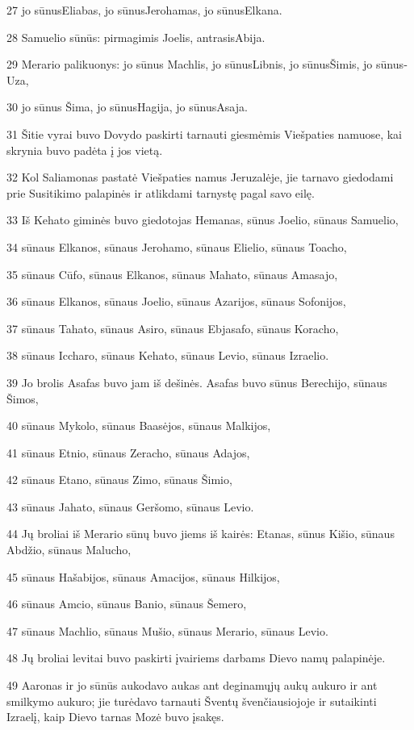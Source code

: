 \par 27 jo sūnus­Eliabas, jo sūnus­Jerohamas, jo sūnus­Elkana. 
\par 28 Samuelio sūnūs: pirmagimis­ Joelis, antrasis­Abija. 
\par 29 Merario palikuonys: jo sūnus­ Machlis, jo sūnus­Libnis, jo sūnus­Šimis, jo sūnus­Uza, 
\par 30 jo sūnus Šima, jo sūnus­Hagija, jo sūnus­Asaja. 
\par 31 Šitie vyrai buvo Dovydo paskirti tarnauti giesmėmis Viešpaties namuose, kai skrynia buvo padėta į jos vietą. 
\par 32 Kol Saliamonas pastatė Viešpaties namus Jeruzalėje, jie tarnavo giedodami prie Susitikimo palapinės ir atlikdami tarnystę pagal savo eilę. 
\par 33 Iš Kehato giminės buvo giedotojas Hemanas, sūnus Joelio, sūnaus Samuelio, 
\par 34 sūnaus Elkanos, sūnaus Jerohamo, sūnaus Elielio, sūnaus Toacho, 
\par 35 sūnaus Cūfo, sūnaus Elkanos, sūnaus Mahato, sūnaus Amasajo, 
\par 36 sūnaus Elkanos, sūnaus Joelio, sūnaus Azarijos, sūnaus Sofonijos, 
\par 37 sūnaus Tahato, sūnaus Asiro, sūnaus Ebjasafo, sūnaus Koracho, 
\par 38 sūnaus Iccharo, sūnaus Kehato, sūnaus Levio, sūnaus Izraelio. 
\par 39 Jo brolis Asafas buvo jam iš dešinės. Asafas buvo sūnus Berechijo, sūnaus Šimos, 
\par 40 sūnaus Mykolo, sūnaus Baasėjos, sūnaus Malkijos, 
\par 41 sūnaus Etnio, sūnaus Zeracho, sūnaus Adajos, 
\par 42 sūnaus Etano, sūnaus Zimo, sūnaus Šimio, 
\par 43 sūnaus Jahato, sūnaus Geršomo, sūnaus Levio. 
\par 44 Jų broliai iš Merario sūnų buvo jiems iš kairės: Etanas, sūnus Kišio, sūnaus Abdžio, sūnaus Malucho, 
\par 45 sūnaus Hašabijos, sūnaus Amacijos, sūnaus Hilkijos, 
\par 46 sūnaus Amcio, sūnaus Banio, sūnaus Šemero, 
\par 47 sūnaus Machlio, sūnaus Mušio, sūnaus Merario, sūnaus Levio. 
\par 48 Jų broliai levitai buvo paskirti įvairiems darbams Dievo namų palapinėje. 
\par 49 Aaronas ir jo sūnūs aukodavo aukas ant deginamųjų aukų aukuro ir ant smilkymo aukuro; jie turėdavo tarnauti Šventų švenčiausiojoje ir sutaikinti Izraelį, kaip Dievo tarnas Mozė buvo įsakęs. 
